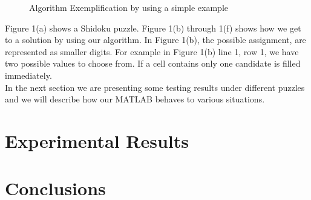 \documentclass[12pt,a4paper]{article} %
\begin{document}
\begin{figure}[ht!]
\begin{center}
%
\end{center}
\caption{%
Algorithm Exemplification by using a simple example
}%
\end{figure}
Figure 1(a) shows a Shidoku puzzle. Figure 1(b) through 1(f) shows how we get to a solution by using our algorithm. In Figure 1(b), the possible assignment, are represented as smaller digits. For example in Figure 1(b) line 1, row 1, we have two possible values to choose from. If a cell contains only one candidate is filled immediately.
\newline
\\ In the next section we are presenting some testing results under different puzzles and we will describe how our MATLAB behaves to various situations. 
\section{Experimental Results}
\section{Conclusions}
{}

\end{document}

